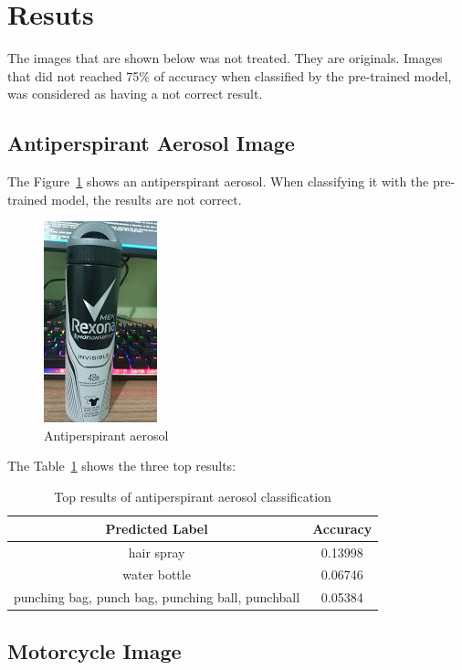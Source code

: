 \documentclass[12pt]{article}
\begin{document}
\section{Resuts}

The images that are shown below was not treated. They are originals. Images that did not reached 75\% of accuracy when classified by the pre-trained model, was considered as having a not correct result.

\subsection{Antiperspirant Aerosol Image}

The Figure~\ref{fig:image1} shows an antiperspirant aerosol. When classifying it with the pre-trained model, the results are not correct.

\begin{figure}[H]
  \centering
  \includegraphics[width=.2\textwidth]{images/rexona.jpg}
  \caption{Antiperspirant aerosol}
  \label{fig:image1}
\end{figure}

The Table~\ref{tab:result1} shows the three top results:

\begin{table}[H]
  \centering
  \caption{Top results of antiperspirant aerosol classification}
  \begin{tabular}{|c|c|}
    \hline
      Predicted Label & Accuracy \\
    \hline
    hair spray & 0.13998 \\
    water bottle & 0.06746 \\
    punching bag, punch bag, punching ball, punchball & 0.05384 \\
    \hline
  \end{tabular}
  \label{tab:result1}
\end{table}

\subsection{Motorcycle Image}
\end{document}
